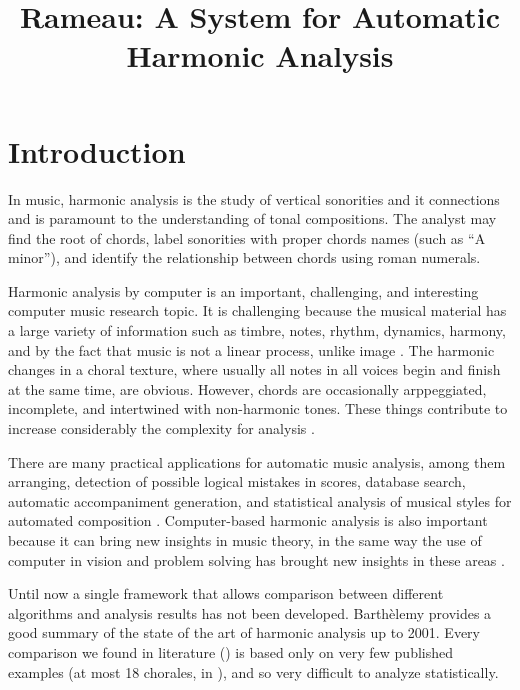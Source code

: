 \documentclass{article}
\title{Rameau: A System for Automatic Harmonic Analysis}
\begin{document}
\graphicspath{{figs/}{data/}}
\maketitle

\begin{abstract}

\end{abstract}

\section{Introduction}
\label{sec:introduction}

In music, harmonic analysis is the study of vertical sonorities and it
connections and is paramount to the understanding of tonal
compositions. The analyst may find the root of chords, label
sonorities with proper chords names (such as ``A minor''), and
identify the relationship between chords using roman
numerals.

Harmonic analysis by computer is an important, challenging, and
interesting computer music research topic. It is challenging because
the musical material has a large variety of information such as
timbre, notes, rhythm, dynamics, harmony, and by the fact that music
is not a linear process, unlike image \cite{mouton.ea:numeric}. The
harmonic changes in a choral texture, where usually all notes in all
voices begin and finish at the same time, are obvious. However, chords
are occasionally arppeggiated, incomplete, and intertwined with
non-harmonic tones. These things contribute to increase considerably
the complexity for analysis \cite{pardo.ea:automated}.

There are many practical applications for automatic music analysis,
among them arranging, detection of possible logical mistakes in
scores, database search, automatic accompaniment generation, and
statistical analysis of musical styles for automated composition
\cite{pardo.ea:algorithms,temperley.ea:modeling}. Computer-based
harmonic analysis is also important because it can bring new insights
in music theory, in the same way the use of computer in vision and
problem solving has brought new insights in these areas
\cite{temperley.ea:modeling}. 

Until now a single framework that allows comparison between different
algorithms and analysis results has not been developed.  Barthèlemy
\cite{barthelemy.ea:figured} provides a good summary of the state of
the art of harmonic analysis up to 2001. Every comparison we found in
literature (\cite{pardo.ea:automated, barthelemy.ea:figured,
  tsui:harmonic, taube:automatic, illescas.ea:harmonic}) is based only
on very few published examples (at most 18 chorales, in
\cite{tsui:harmonic}), and so very difficult to analyze statistically.
\end{document}
